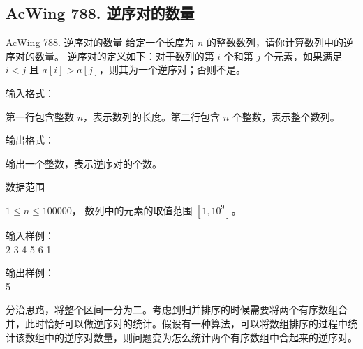 \subsection{AcWing 788. 逆序对的数量}
\begin{titledbox}{AcWing 788. 逆序对的数量}
    给定一个长度为 $n$ 的整数数列，请你计算数列中的逆序对的数量。
    逆序对的定义如下：对于数列的第 $i$ 个和第 $j$ 个元素，如果满足 $i < j$ 且 $a[i] > a[j]$，则其为一个逆序对；否则不是。

    输入格式：

    第一行包含整数 $n$，表示数列的长度。第二行包含 $n$ 个整数，表示整个数列。

    输出格式：

    输出一个整数，表示逆序对的个数。

    数据范围

    $1 \le n \le 100000$，
    数列中的元素的取值范围 $[1,10^9]$。

    \begin{minipage}[t]{.5\textwidth}
        输入样例：\\
        2 3 4 5 6 1
    \end{minipage}%
    \begin{minipage}[t]{.5\textwidth}
        输出样例：\\
        5
    \end{minipage}
\end{titledbox}

分治思路，将整个区间一分为二。考虑到归并排序的时候需要将两个有序数组合并，此时恰好可以做逆序对的统计。假设有一种算法，可以将数组排序的过程中统计该数组中的逆序对数量，则问题变为怎么统计两个有序数组中合起来的逆序对。

